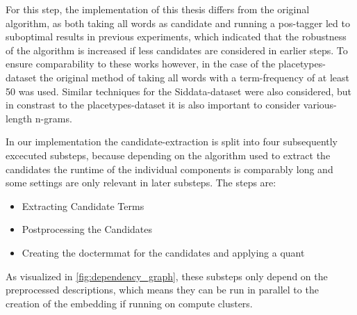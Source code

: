 For this step, the implementation of this thesis differs from the original algorithm, as both taking all words as candidate and running a \gls{pos}-tagger led to suboptimal results in previous experiments, which indicated that the robustness of the algorithm is increased if less candidates are considered in earlier steps.  To ensure comparability to these works however, in the case of the placetypes-dataset the original method of taking all words with a term-frequency of at least 50 was used. Similar techniques for the Siddata-dataset were also considered, but in constrast to the placetypes-dataset it is also important to consider various-length n-grams. 


In our implementation the candidate-extraction is split into four subsequently excecuted substeps, because depending on the algorithm used to extract the candidates the runtime of the individual components is comparably long and some settings are only relevant in later substeps. The steps are:
\begin{itemize}
	\item Extracting Candidate Terms
	\item Postprocessing the Candidates
	\item Creating the \gls{doctermmat} for the candidates and applying a \gls{quant}
\end{itemize}

As visualized in \autoref{fig:dependency_graph}, these substeps only depend on the preprocessed descriptions, which means they can be run in parallel to the creation of the embedding if \eg running on compute clusters.

